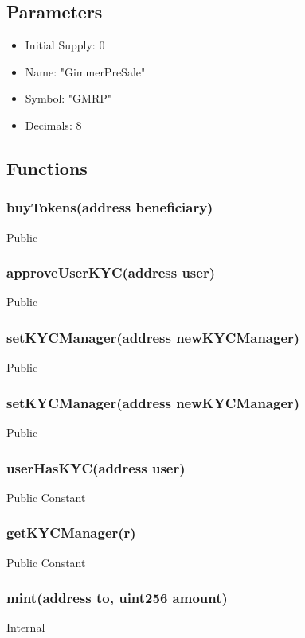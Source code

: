 \documentclass[11pt]{article} %
\begin{document}
\subsection{Parameters}
\begin{itemize}
\item Initial Supply: 0
\item Name: "GimmerPreSale"
\item Symbol: "GMRP"
\item Decimals: 8
\end{itemize}

\subsection{Functions}

\subsubsection{buyTokens(address beneficiary)}
Public

\subsubsection{approveUserKYC(address user)}
Public

\subsubsection{setKYCManager(address newKYCManager)}
Public

\subsubsection{setKYCManager(address newKYCManager)}
Public

\subsubsection{userHasKYC(address user)}
Public Constant

\subsubsection{getKYCManager(r)}
Public Constant

\subsubsection{mint(address to, uint256 amount)}
Internal
\end{document}
